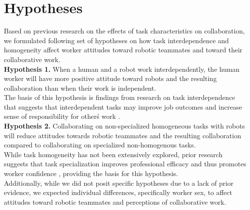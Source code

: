 \section{Hypotheses}
       Based on previous research on the effects of task characteristics on collaboration, we formulated following set of hypotheses on how task interdependence and homogeneity affect worker attitudes toward robotic teammates and toward their collaborative work.\\
       \textbf{Hypothesis 1.} When a human and a robot work interdependently, the human worker will have more positive attitude toward robots and the resulting collaboration than when their work is independent.\\
       The basis of this hypothesis is findings from research on task interdependence that suggests 
that interdependent tasks may improve job outcomes and increase sense of responsibility for other\' s work \cite{van1998motivating, johnson2012autonomy}.\\
       \textbf{Hypothesis 2.} Collaborating on non-specialized homogeneous tasks with robots will reduce attitudes towards robotic teammates and the resulting collaboration compared to collaborating on specialized non-homogenous tasks.\\
       While task homogeneity has not been extensively explored, prior research suggests that task specialization improves professional efficacy and thus promotes worker confidence \cite{hsieh2004reassessment}, providing the basis for this hypothesis.\\
       Additionally, while we did not posit specific hypotheses due to a lack of prior evidence, we expected individual differences, specifically worker sex, to affect attitudes toward robotic teammates and perceptions of collaborative work.
